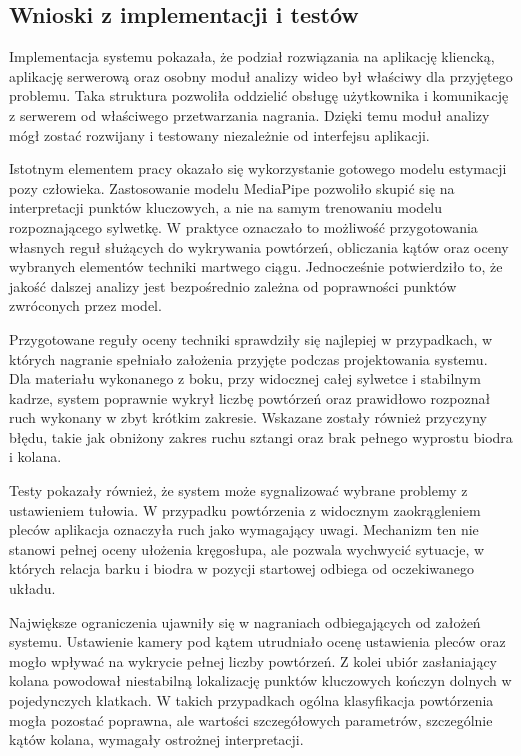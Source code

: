 \subsection*{Wnioski z implementacji i testów}

Implementacja systemu pokazała, że podział rozwiązania na aplikację kliencką, aplikację serwerową oraz osobny moduł analizy wideo był właściwy dla przyjętego problemu. Taka struktura pozwoliła oddzielić obsługę użytkownika i komunikację z serwerem od właściwego przetwarzania nagrania. Dzięki temu moduł analizy mógł zostać rozwijany i testowany niezależnie od interfejsu aplikacji.

Istotnym elementem pracy okazało się wykorzystanie gotowego modelu estymacji pozy człowieka. Zastosowanie modelu MediaPipe pozwoliło skupić się na interpretacji punktów kluczowych, a nie na samym trenowaniu modelu rozpoznającego sylwetkę. W praktyce oznaczało to możliwość przygotowania własnych reguł służących do wykrywania powtórzeń, obliczania kątów oraz oceny wybranych elementów techniki martwego ciągu. Jednocześnie potwierdziło to, że jakość dalszej analizy jest bezpośrednio zależna od poprawności punktów zwróconych przez model.

Przygotowane reguły oceny techniki sprawdziły się najlepiej w przypadkach, w których nagranie spełniało założenia przyjęte podczas projektowania systemu. Dla materiału wykonanego z boku, przy widocznej całej sylwetce i stabilnym kadrze, system poprawnie wykrył liczbę powtórzeń oraz prawidłowo rozpoznał ruch wykonany w zbyt krótkim zakresie. Wskazane zostały również przyczyny błędu, takie jak obniżony zakres ruchu sztangi oraz brak pełnego wyprostu biodra i kolana.

Testy pokazały również, że system może sygnalizować wybrane problemy z ustawieniem tułowia. W przypadku powtórzenia z widocznym zaokrągleniem pleców aplikacja oznaczyła ruch jako wymagający uwagi. Mechanizm ten nie stanowi pełnej oceny ułożenia kręgosłupa, ale pozwala wychwycić sytuacje, w których relacja barku i biodra w pozycji startowej odbiega od oczekiwanego układu.

Największe ograniczenia ujawniły się w nagraniach odbiegających od założeń systemu. Ustawienie kamery pod kątem utrudniało ocenę ustawienia pleców oraz mogło wpływać na wykrycie pełnej liczby powtórzeń. Z kolei ubiór zasłaniający kolana powodował niestabilną lokalizację punktów kluczowych kończyn dolnych w pojedynczych klatkach. W takich przypadkach ogólna klasyfikacja powtórzenia mogła pozostać poprawna, ale wartości szczegółowych parametrów, szczególnie kątów kolana, wymagały ostrożnej interpretacji.

